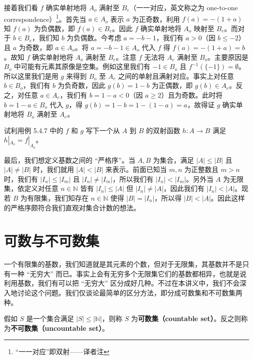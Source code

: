 \begin{example}
接着我们看 $f$ 确实单射地将 $A_o$ 满射至 $B_e$（一一对应，英文称之为 one-to-one correspondence）\footnote{“一一对应”即双射——译者注}。首先当 $a \in A_o$ 表示 $a$ 为正奇数，利用 $f(a) = -(1 + a)$ 知 $f(a)$ 为负偶数，即 $f(a) \in B_e$。因此 $f$ 确实单射地将 $A_o$ 映射至 $B_e$。而对于 $b \in B_e$，我们知 $b$ 为负偶数。今考虑 $a = -b - 1$，我们有 $a > 0$（因 $b \leq -2$）且 $a$ 为奇数，即 $a \in A_o$。将 $a = -b - 1 \in A_o$ 代入 $f$ 得 $f(a) = -(1 + a) = b$。故知 $f$ 确实单射地将 $A_o$ 满射至 $B_e$。注意 $f$ 无法将 $A_e$ 满射至 $B_o$。主要原因是 $B_o$ 中可能有元素其原像是空集。例如这里我们有 $-1 \in B_o$ 且 $f^{-1}(\{-1\}) = \emptyset$。所以这里我们是用 $g$ 来得到 $B_o$ 至 $A_e$ 之间的单射且满射对应。事实上对任意 $b \in B_o$，我们有 $b$ 为负奇数，因此 $g(b) = 1 - b$ 为正偶数，即 $g(b) \in A_e$。反之，对任意 $a \in A_e$，我们有 $b = 1 - a < 0$（因 $a \geq 2$）且为奇数。此时将 $b = 1 - a \in B_o$ 代入 $g$，得 $g(b) = 1 - b = 1 - (1 - a) = a$，故得证 $g$ 确实单射地将 $B_o$ 满射至 $A_e$。
\end{example}

\begin{question}
试利用例 5.4.7 中的 $f$ 和 $g$ 写下一个从 $A$ 到 $B$ 的双射函数 $h : A \to B$ 满足 $h|_{A_o} = f|_{A_o}$。
\end{question}

最后，我们想定义基数之间的 “严格序”。当 $A, B$ 为集合，满足 $|A| \leq |B|$ 且 $|A| \neq |B|$ 时，我们就用 $|A| < |B|$ 来表示。前面已知当 $m, n$ 为正整数且 $m > n$ 时，我们有 $|I_n| \leq |I_m|$ 且 $|I_n| \neq |I_m|$，所以我们有 $|I_n| < |I_m|$。另外当 $A$ 为无限集，依定义对任意 $n \in \mathbb{N}$ 皆有 $|I_n| \leq |A|$ 但 $|I_n| \neq |A|$，因此我们有 $|I_n| < |A|$。现若 $B$ 为有限集，我们知存在 $n \in \mathbb{N}$ 使得 $|B| = |I_n|$，所以得 $|B| < |A|$。因此这样的严格序颇符合我们直观对集合计数的想法。

\section{可数与不可数集}

一个有限集的基数，我们知道就是其元素的个数，但对于无限集，其基数并不是只有一种 “无穷大” 而已。事实上会有无穷多个无限集它们的基数都相异，也就是说利用基数，我们有可以把 “无穷大” 区分成好几种。不过在本讲义中，我们不会深入地讨论这个问题。我们仅谈论最简单的区分方法，即分成可数集和不可数集两种。

\begin{definition}
假如 $S$ 是一个集合满足 $|S| \leq |\mathbb{N}|$，则称 $S$ 为{\bf 可数集（countable set）}。反之则称为{\bf 不可数集（uncountable set）}。
\end{definition}

